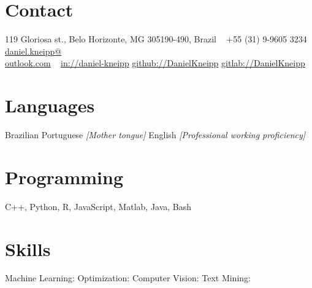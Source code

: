 \documentclass[a4paper]{cv-friggeri-x}
\begin{document}


\begin{aside} %
\section{Contact}
\pin \hfill 119 Gloriosa st.,
Belo Horizonte, MG 
305190-490, Brazil
~
{\Large\textcolor{gray}{\Mobilefone}} \hfill +55 (31) 9-9605 3234
{\Large\textcolor{gray}{\Letter}} \hfill \href{mailto:daniel.kneipp@outlook.com}{daniel.kneipp@\\outlook.com}
~
\llogo \hfill \href{https://www.linkedin.com/in/daniel-kneipp/}{in://daniel-kneipp}
\githublogo \hfill \href{https://github.com/DanielKneipp}{github://DanielKneipp}
\gitlablogo \hfill \href{https://gitlab.com/DanielKneipp}{gitlab://DanielKneipp}
\section{Languages}
Brazilian Portuguese \hspace{5mm}\null
\textit{[Mother tongue]}
English  \hspace{5mm}\null
\textit{[Professional working proficiency]}
\section{Programming}
C++, Python, R, JavaScript,
Matlab, Java, Bash
~
\section{Skills}
Machine Learning: \hspace{5mm}\null
{} 
Optimization:     \hspace{5mm}\null  
{}
Computer Vision:  \hspace{5mm}\null
{}
Text Mining:      \hspace{5mm}\null
{}
\end{aside}
\end{document}
